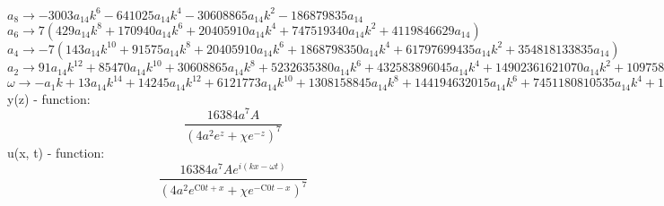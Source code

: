 \documentclass[12pt,a4paper,draft]{article}
\begin{document}
$a_{8}\to -3003 a_{14} k^6-641025 a_{14} k^4-30608865 a_{14} k^2-186879835 a_{14}$\\
$a_{6}\to 7 \left(429 a_{14} k^8+170940 a_{14} k^6+20405910 a_{14} k^4+747519340 a_{14} k^2+4119846629 a_{14}\right)$\\
$a_{4}\to -7 \left(143 a_{14} k^{10}+91575 a_{14} k^8+20405910 a_{14} k^6+1868798350 a_{14} k^4+61797699435 a_{14} k^2+354818133835 a_{14}\right)$\\
$a_{2}\to 91 a_{14} k^{12}+85470 a_{14} k^{10}+30608865 a_{14} k^8+5232635380 a_{14} k^6+432583896045 a_{14} k^4+14902361621070 a_{14} k^2+109758994449399 a_{14}$\\
$\omega \to -a_{1} k+13 a_{14} k^{14}+14245 a_{14} k^{12}+6121773 a_{14} k^{10}+1308158845 a_{14} k^8+144194632015 a_{14} k^6+7451180810535 a_{14} k^4+109758994449399 a_{14} k^2-1905200718446025 a_{14}$\\


y(z) - function:
$$
\frac{16384 a^7 A}{\left(4 a^2 e^z+\chi  e^{-z}\right)^7}
$$
u(x, t) - function:
$$
\frac{16384 a^7 A e^{i (k x-\omega  t)}}{\left(4 a^2 e^{\text{C0} t+x}+\chi  e^{-\text{C0} t-x}\right)^7}
$$
\end{document}

